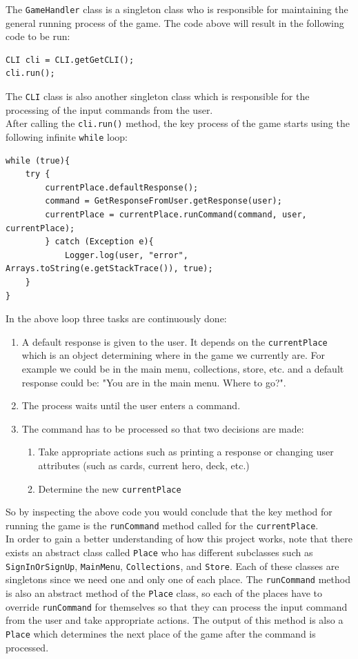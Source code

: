 \documentclass[a4paper]{article}
\begin{document}
The \texttt{GameHandler} class is a singleton class who is responsible for maintaining the general running process of the game. The code above will result in the following code to be run:
\begin{lstlisting}[style = javaStyle]
CLI cli = CLI.getGetCLI();
cli.run();
\end{lstlisting}
The \texttt{CLI} class is also another singleton class which is responsible for the processing of the input commands from the user. \\
After calling the \texttt{cli.run()} method, the key process of the game starts using the following infinite \texttt{while} loop:
\begin{lstlisting}[style = javaStyle]
while (true){
	try {
		currentPlace.defaultResponse();
		command = GetResponseFromUser.getResponse(user);
		currentPlace = currentPlace.runCommand(command, user, currentPlace);
		} catch (Exception e){
			Logger.log(user, "error", Arrays.toString(e.getStackTrace()), true);
	}
}
\end{lstlisting}
In the above loop three tasks are continuously done:
\begin{enumerate}
	\item A default response is given to the user. It depends on the \texttt{currentPlace} which is an object determining where in the game we currently are. For example we could be in the main menu, collections, store, etc. and a default response could be: "You are in the main menu. Where to go?".
	
	\item The process waits until the user enters a command. 
	
	\item The command has to be processed so that two decisions are made:
	\begin{enumerate}
		\item Take appropriate actions such as printing a response or changing user attributes (such as cards, current hero, deck, etc.)
		\item Determine the new \texttt{currentPlace}
	\end{enumerate}
\end{enumerate}

So by inspecting the above code you would conclude that the key method for running the game is the \texttt{runCommand} method called for the \texttt{currentPlace}.\\
In order to gain a better understanding of how this project works, note that there exists an abstract class called \texttt{Place} who has different subclasses such as \texttt{SignInOrSignUp}, \texttt{MainMenu}, \texttt{Collections}, and \texttt{Store}. Each of these classes are singletons since we need one and only one of each place. The \texttt{runCommand} method is also an abstract method of the \texttt{Place} class, so each of the places have to override \texttt{runCommand} for themselves so that they can process the input command from the user and take appropriate actions. The output of this method is also a \texttt{Place} which determines the next place of the game after the command is processed.
\end{document}
